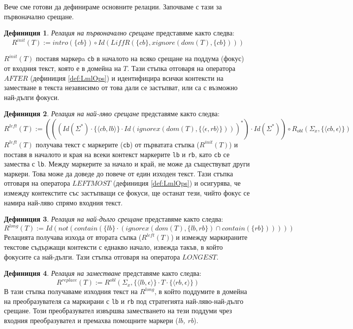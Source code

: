 \documentclass[12pt, oneside]{article}
\theoremstyle{definition}
\newtheorem{definition}{Дефиниция}[section]
\begin{document}
Вече сме готови да дефинираме основните релации. Започваме с тази за първоначално срещане.

\begin{definition}\label{def:Rinit} \emph{Релация на първоначално срещане} представяме както следва:
	\[ R^{init}(T) := intro(\{ cb \}) \circ Id(LiffR(\{ cb \}, xignore(dom(T), \{ cb \}))) \]

	\( R^{init}(T) \) поставя маркерa \verb/cb/ в началото на всяко срещане на поддума (фокус) от входния текст, която е в домейна на \(T\). Тази стъпка отговаря на оператора \(AFTER\) (дефиниция \ref{def:LmlOps}) и идентифицира всички контексти на заместване в текста независимо от това дали се застъпват, или са с възможно най-дълги фокуси. 
\end{definition}

\begin{definition}\label{def:Rleft} \emph{Релация на най-ляво срещане} представяме както следва:
	\[ R^{left}(T) := (((Id(\Sigma^*) \cdot \{ \langle cb, lb \rangle \} \cdot Id(ignorex(dom(T), \{ \langle \epsilon, rb \rangle \})))^*) \cdot Id(\Sigma^*)) \circ R_{obl} (\Sigma_x, \{ \langle cb, \epsilon \rangle \}) \]
	\(R^{left}(T)\) получава текст с маркерите (\verb/cb/) от първатата стъпка (\(R^{init}(T)\)) и поставя в началото и края на всеки контекст маркерите \verb/lb/ и \verb/rb/, като  \verb/cb/ се замества с \verb/lb/. Между маркерите за начало и край, не може да съществуват други маркери. Това може да доведе до повече от един изходен текст. Тази стъпка отговаря на оператора \(LEFTMOST\) (дефиниция \ref{def:LmlOps}) и осигурява, че измежду контекстите със застъпващи се фокуси, ще останат тези, чийто фокус се намира най-ляво спрямо входния текст.
\end{definition}

\begin{definition}\label{def:Rlong} \emph{Релация на най-дълго срещане} представяме както следва:
	\[ R^{long}(T) := Id(not(contain(\{lb\} \cdot (ignorex(dom(T), \{lb, rb\}) \cap contain(\{rb\}))))) \]
	Релацията получава изхода от втората съпка (\(R^{left}(T)\)) и измежду маркираните текстове съдържащи контексти с еднакво начало, извежда такъв, в който фокусите са най-дълги. Тази стъпка отговаря на оператора \(LONGEST\).
\end{definition}

\begin{definition}\label{def:Rreplace} \emph{Релация на заместване} представяме както следва:
	\[ R^{replace}(T) := R^{obl}(\Sigma_x, \{ \langle lb, \epsilon \rangle \} \cdot T \cdot \{ \langle rb, \epsilon \rangle \}) \]
	В тази стъпка получаваме изходния текст на \(R^{long}\), в който поддумите в домейна на преобразувателя са маркирани с \verb/lb/ и \verb/rb/ под стратегията най-ляво-най-дълго срещане. Този преобразувател извършва заместването на тези поддуми чрез входния преобразувател и премахва помощните маркери (\emph{lb, rb}).
\end{definition}
\end{document}
